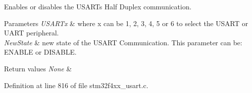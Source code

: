 Enables or disables the U\+S\+A\+RT\textquotesingle{}s Half Duplex communication. 


\begin{DoxyParams}{Parameters}
{\em U\+S\+A\+R\+Tx} & where x can be 1, 2, 3, 4, 5 or 6 to select the U\+S\+A\+RT or U\+A\+RT peripheral. \\
\hline
{\em New\+State} & new state of the U\+S\+A\+RT Communication. This parameter can be\+: E\+N\+A\+B\+LE or D\+I\+S\+A\+B\+LE. \\
\hline
\end{DoxyParams}

\begin{DoxyRetVals}{Return values}
{\em None} & \\
\hline
\end{DoxyRetVals}


Definition at line 816 of file stm32f4xx\+\_\+usart.\+c.

